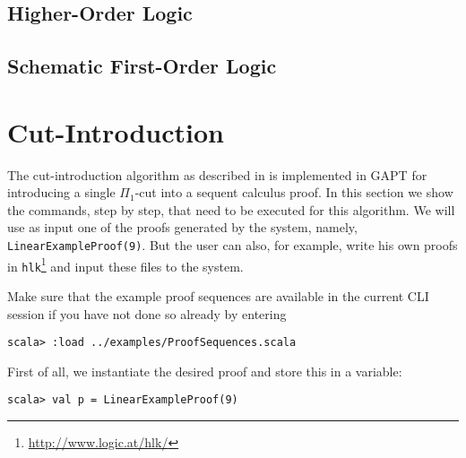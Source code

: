 \documentclass[a4paper,11pt]{article}
\begin{document}
\subsection{Higher-Order Logic}


\subsection{Schematic First-Order Logic}


\section{Cut-Introduction}

The cut-introduction algorithm as described in \cite{cutIntro2013} is
implemented in GAPT for introducing a single $\Pi_1$-cut into a sequent calculus
proof. In this section we show the commands, step by step, that need to be
executed for this algorithm. We will use as input one of the proofs generated by
the system, namely, \texttt{LinearExampleProof(9)}. But the
user can also, for example, write his own proofs in
\texttt{hlk}\footnote{\url{http://www.logic.at/hlk/}} and input these files to
the system. 

Make sure that the example proof sequences are available in the current CLI
session if you have not done so already by entering
\begin{lstlisting}
scala> :load ../examples/ProofSequences.scala
\end{lstlisting}
%
First of all, we instantiate the desired proof and store this in a variable:
\begin{lstlisting}
scala> val p = LinearExampleProof(9) 
\end{lstlisting}
\end{document}
